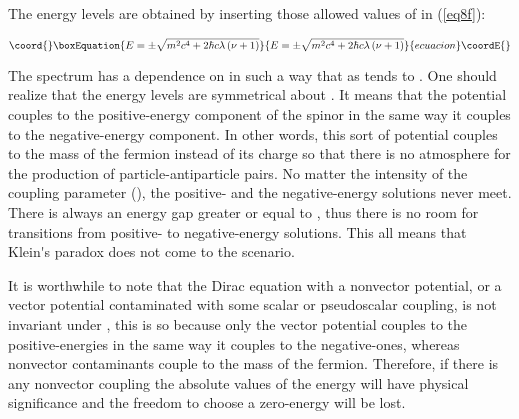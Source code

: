\documentclass[a4paper,12pt,titlepage]{article}
\begin{document}
The energy levels are obtained by inserting those allowed values of \myHighlight{$\nu $}\coordHE{}
in (\ref{eq8f}):

\begin{equation}\coord{}\boxEquation{
E=\pm \sqrt{m^{2}c^{4}+2\hbar c\lambda \left( \nu +1\right) }  \label{eq25}
}{
E=\pm \sqrt{m^{2}c^{4}+2\hbar c\lambda \left( \nu +1\right) }  }{ecuacion}\coordE{}\end{equation}

\noindent The spectrum has a dependence on \myHighlight{$\nu $}\coordHE{} in such a way that \coordHE{} as \myHighlight{$\nu $}\coordHE{} tends to \myHighlight{$\pm \infty $}\coordHE{}. One should realize that the energy
levels are symmetrical about \coordHE{}. It means that the potential couples to
the positive-energy component of the spinor in the same way it couples to
the negative-energy component. In other words, this sort of potential
couples to the mass of the fermion instead of its charge so that there is no
atmosphere for the production of particle-antiparticle pairs. No matter the
intensity of the coupling parameter (\myHighlight{$\lambda $}\coordHE{}), the positive- and the
negative-energy solutions never meet. There is always an energy gap greater
or equal to \coordHE{}, thus there is no room for transitions from positive-
to negative-energy solutions. This all means that Klein\'{}s paradox does
not come to the scenario.

It is worthwhile to note that the Dirac equation with a nonvector potential,
or a vector potential contaminated with some scalar or pseudoscalar
coupling, is not invariant under \coordHE{}, this is so because
only the vector potential couples to the positive-energies in the same way
it couples to the negative-ones, whereas nonvector contaminants couple to
the mass of the fermion. Therefore, if there is any nonvector coupling the
absolute values of the energy will have physical significance and the
freedom to choose a zero-energy will be lost.
\end{document}
